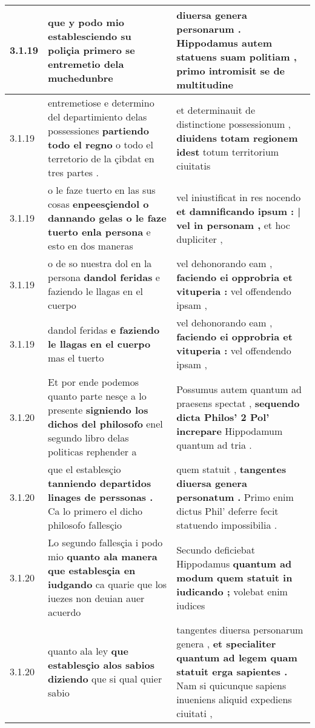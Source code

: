 \begin{tabular}{|p{1cm}|p{6.5cm}|p{6.5cm}|}
3.1.19 & que y podo mio \textbf{ establesciendo su poliçia } primero se entremetio dela muchedunbre & diuersa genera personarum . \textbf{ Hippodamus autem statuens suam politiam , } primo intromisit se de multitudine \\\hline
3.1.19 & entremetiose e determino del departimiento delas possessiones \textbf{ partiendo todo el regno } o todo el terretorio de la çibdat en tres partes . & et determinauit de distinctione possessionum , \textbf{ diuidens totam regionem idest } totum territorium ciuitatis \\\hline
3.1.19 & o le faze tuerto en las sus cosas \textbf{ enpeesçiendol o dannando gelas o le faze tuerto enla persona } e esto en dos maneras & vel iniustificat in res nocendo \textbf{ et damnificando ipsum : | vel in personam , } et hoc dupliciter , \\\hline
3.1.19 & o de so nuestra dol en la persona \textbf{ dandol feridas } e faziendo le llagas en el cuerpo & vel dehonorando eam , \textbf{ faciendo ei opprobria et vituperia : } vel offendendo ipsam , \\\hline
3.1.19 & dandol feridas \textbf{ e faziendo le llagas en el cuerpo } mas el tuerto & vel dehonorando eam , \textbf{ faciendo ei opprobria et vituperia : } vel offendendo ipsam , \\\hline
3.1.20 & Et por ende podemos quanto parte nesçe a lo presente \textbf{ signiendo los dichos del philosofo } enel segundo libro delas politicas rephender a & Possumus autem quantum ad praesens spectat , \textbf{ sequendo dicta Philos’ 2 Pol’ increpare } Hippodamum quantum ad tria . \\\hline
3.1.20 & que el establesçio \textbf{ tanniendo departidos linages de perssonas . } Ca lo primero el dicho philosofo fallesçio & quem statuit , \textbf{ tangentes diuersa genera personatum . } Primo enim dictus Phil’ deferre fecit statuendo impossibilia . \\\hline
3.1.20 & Lo segundo fallesçia i podo mio \textbf{ quanto ala manera que establesçia en iudgando } ca quarie que los iuezes non deuian auer acuerdo & Secundo deficiebat Hippodamus \textbf{ quantum ad modum quem statuit in iudicando ; } volebat enim iudices \\\hline
3.1.20 & quanto ala ley \textbf{ que establesçio alos sabios diziendo } que si qual quier sabio & tangentes diuersa personarum genera , \textbf{ et specialiter quantum ad legem quam statuit erga sapientes . } Nam si quicunque sapiens inueniens aliquid expediens ciuitati , \\\hline

\end{tabular}
